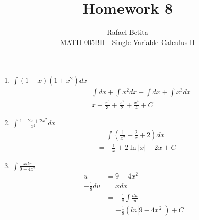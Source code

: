 \documentclass[12pt]{article}
\begin{document}
 
 
\title{Homework 8}
\author{Rafael Betita\\ 
MATH 005BH - Single Variable Calculus II}
 
\maketitle
 
\newpage

\begin{enumerate}
    \item $\int (1+x)(1+x^2)dx$
        \begin{align*}
             &=\int dx + \int x^2dx + \int dx + \int x^3dx \\
             &= x +\frac{x^3}{3} + \frac{x^2}{2} + \frac{x^4}{4} + C 
        \end{align*}
        
    \item $\int \frac{1+2x+2x^2}{x^2}dx$
        \begin{align*}
            &= \int \left(\frac{1}{x^2}+\frac{2}{x}+2\right)dx\\
            &= -\frac{1}{x}+2\ln|x|+2x+C
        \end{align*}

    \item $\int \frac{xdx}{9-4x^2}$
        \begin{align*}
            u &= 9-4x^2\\
            -\frac{1}{8}du &= xdx\\
            &= -\frac{1}{8}\int\frac{du}{u}\\
            &= -\frac{1}{8}\left(ln|9-4x^2|\right)+C\\
        \end{align*}
    
\end{enumerate}
 

 
 
\end{document}

